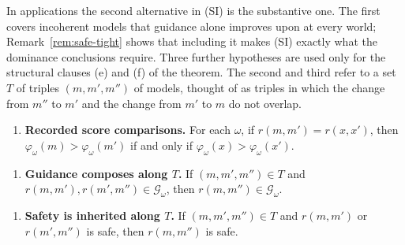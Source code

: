 \documentclass[11pt]{article}
\theoremstyle{definition}
\theoremstyle{remark}
\newcommand{\G}{\mathcal G}
\begin{document}
In applications the second alternative in (SI) is the substantive one. The first covers incoherent models that guidance alone improves upon at every world; Remark~\ref{rem:safe-tight} shows that including it makes (SI) exactly what the dominance conclusions require. Three further hypotheses are used only for the structural clauses (e) and (f) of the theorem. The second and third refer to a set $T$ of triples $(m,m',m'')$ of models, thought of as triples in which the change from $m''$ to $m'$ and the change from $m'$ to $m$ do not overlap.
\begin{enumerate}[label=\textbf{(RS)},leftmargin=*]
\item \textbf{Recorded score comparisons.} For each $\omega$, if $r(m,m')=r(x,x')$, then $\varphi_\omega(m)>\varphi_\omega(m')$ if and only if $\varphi_\omega(x)>\varphi_\omega(x')$.
\end{enumerate}
\begin{enumerate}[label=\textbf{(TG)},leftmargin=*]
\item \textbf{Guidance composes along $T$.} If $(m,m',m'')\in T$ and $r(m,m'),r(m',m'')\in\G_\omega$, then $r(m,m'')\in\G_\omega$.
\end{enumerate}
\begin{enumerate}[label=\textbf{(TS)},leftmargin=*]
\item \textbf{Safety is inherited along $T$.} If $(m,m',m'')\in T$ and $r(m,m')$ or $r(m',m'')$ is safe, then $r(m,m'')$ is safe.
\end{enumerate}
\end{document}
